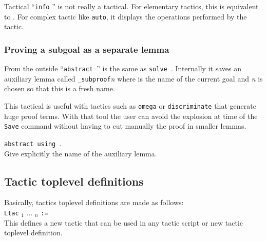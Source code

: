 Tactical ``{\tt info} {\tacexpr}'' is not really a tactical. For
elementary tactics, this is equivalent to \tacexpr. For complex tactic
like \texttt{auto}, it displays the operations performed by the
tactic.


\subsubsection{Proving a subgoal as a separate lemma}
From the outside ``\texttt{abstract \tacexpr}'' is the same as
{\tt solve \tacexpr}. Internally it saves an auxiliary lemma called 
{\ident}\texttt{\_subproof}\textit{n} where {\ident} is the name of the
current goal and \textit{n} is chosen so that this is a fresh name.

This tactical is useful with tactics such as \texttt{omega} or
\texttt{discriminate} that generate huge proof terms. With that tool
the user can avoid the explosion at time of the \texttt{Save} command
without having to cut manually the proof in smaller lemmas.

\begin{Variants}
\item \texttt{abstract {\tacexpr} using {\ident}}.\\
  Give explicitly the name of the auxiliary lemma.
\end{Variants}

\ErrMsg {}

\subsection{Tactic toplevel definitions}

Basically, tactics toplevel definitions are made as follows:\\

%
%

{\tt Ltac} {\ident} {\ident}$_1$ ... {\ident}$_n$ {\tt :=}
{\tacexpr}\\

\noindent This defines a new tactic that can be used in any tactic
script or new tactic toplevel definition.

